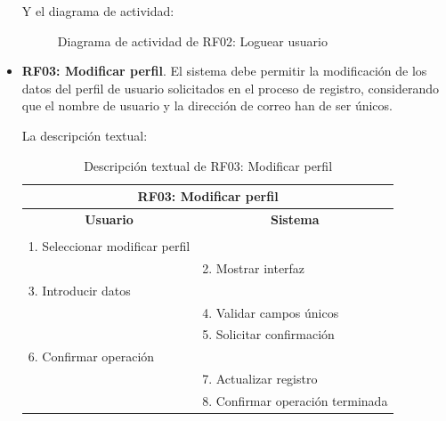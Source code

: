 \begin{itemize}
	\FloatBarrier
	Y el diagrama de actividad:
	\begin{figure}[!htb]
		\centering
		\caption{Diagrama de actividad de RF02: Loguear usuario}
		\label{fig:diagramaActividad_RF02}
	\end{figure}

	\FloatBarrier
	\item \textbf{RF03: Modificar perfil}. El sistema debe permitir la modificación de los datos del perfil de usuario solicitados en el proceso de registro, considerando que el nombre de usuario y la dirección de correo han de ser únicos.
	
	La descripción textual:
	\begin{table}[h]
		\centering	
		\begin{tabular}{|l|l|}
			\hline
			\multicolumn{2}{|c|}{\textbf{RF03: Modificar perfil}} \\ \hline
			\multicolumn{1}{|c|}{\textbf{Usuario}} & \multicolumn{1}{c|}{\textbf{Sistema}} \\ \hline
			[Pto. inclusión: RF02: Loguear usuario] &\\ \hline
			1. Seleccionar modificar perfil &\\ \hline
			& 2. Mostrar interfaz\\ \hline
			3. Introducir datos &\\ \hline
			& 4. Validar campos únicos\\ \hline
			& 5. Solicitar confirmación\\ \hline
			6. Confirmar operación &\\ \hline
			& 7. Actualizar registro \\ \hline
			& 8. Confirmar operación terminada \\ \hline 
		\end{tabular}
		\caption{Descripción textual de RF03: Modificar perfil}
		\label{tab:tablaDescTextualRF03}
	\end{table}
	

\end{itemize}
